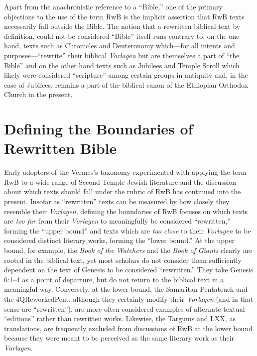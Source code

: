 Apart from the anachronistic reference to a ``Bible,'' one of the
primary objections to the use of the term RwB is the implicit assertion
that RwB texts necessarily fall outside the
Bible.\autocite[61]{campbell_zsengeller2014} The notion that a rewritten
biblical text by definition, could not be considered ``Bible'' itself
runs contrary to, on the one hand, texts such as Chronicles and
Deuteronomy which---for all intents and purposes---``rewrite'' their
biblical \emph{Vorlagen} but are themselves a part of ``the Bible'' and
on the other hand texts such as Jubilees and Temple Scroll which likely
were considered ``scripture'' among certain groups in antiquity and, in
the case of Jubilees, remains a part of the biblical canon of the
Ethiopian Orthodox Church in the present.

\section{Defining the Boundaries of
Rewritten Bible}\label{defining-the-boundaries-of-rwb}

Early adopters of the Vermes's taxonomy experimented with applying the
term RwB to a wide range of Second Temple Jewish literature and the
discussion about which texts should fall under the rubric of RwB has
continued into the present. Insofar as ``rewritten'' texts can be
measured by how closely they resemble their \emph{Vorlagen}, defining
the boundaries of RwB focuses on which texts are \emph{too far} from
their \emph{Vorlagen} to meaningfully be considered ``rewritten,''
forming the ``upper bound'' and texts which are \emph{too close} to
their \emph{Vorlagen} to be considered distinct literary works, forming
the ``lower bound.'' At the upper bound, for example, the \emph{Book of
the Watchers} and the \emph{Book of Giants} clearly are rooted in the
biblical text, yet most scholars do not consider them sufficiently
dependent on the text of Genesis to be considered ``rewritten.'' They
take Genesis 6:1--4 as a point of departure, but do not return to the
biblical text in a meaningful way. Conversely, at the lower bound, the
Samaritan Pentateuch and the 4QReworkedPent, although they certainly
modify their \emph{Vorlagen} (and in that sense are ``rewritten''), are
more often considered examples of alternate textual ``editions'' rather
than rewritten works. Likewise, the Targums and LXX, as translations,
are frequently excluded from discussions of RwB at the lower bound
because they were meant to be perceived as the same literary work as
their \emph{Vorlagen}.

